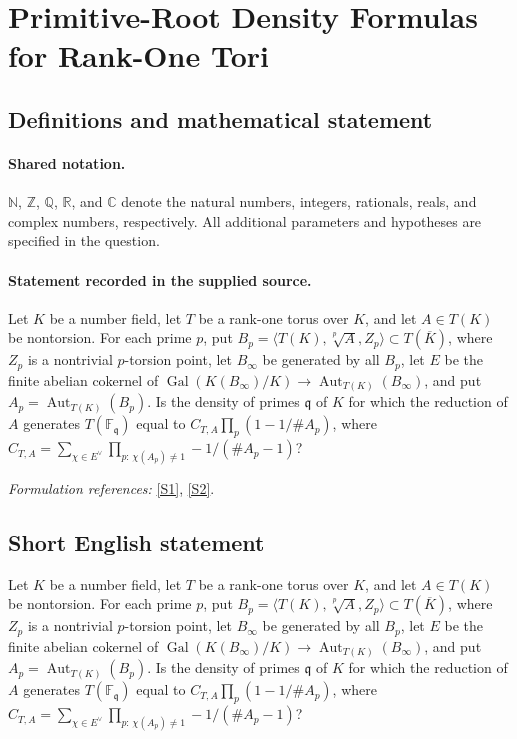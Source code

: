 \documentclass[11pt]{article}
\newcommand{\sref}[2]{\hyperlink{source:#1:#2}{[S#2]}}
\begin{document}
\section{Primitive-Root Density Formulas for Rank-One Tori}\label{statement}

\subsection{Definitions and mathematical statement}

\paragraph{Shared notation.}$\mathbb N$, $\mathbb Z$, $\mathbb Q$, $\mathbb R$, and $\mathbb C$ denote the natural numbers, integers, rationals, reals, and complex numbers, respectively. All additional parameters and hypotheses are specified in the question.


\paragraph{Statement recorded in the supplied source.}
Let $K$ be a number field, let $T$ be a rank-one torus over $K$, and let $A\in T(K)$ be nontorsion. For each prime $p$, put $B_p=\langle T(K),\sqrt[p]{A},Z_p\rangle\subset T(\overline K)$, where $Z_p$ is a nontrivial $p$-torsion point, let $B_\infty$ be generated by all $B_p$, let $E$ be the finite abelian cokernel of $\operatorname{Gal}(K(B_\infty)/K)\to\operatorname{Aut}_{T(K)}(B_\infty)$, and put $A_p=\operatorname{Aut}_{T(K)}(B_p)$. Is the density of primes $\mathfrak q$ of $K$ for which the reduction of $A$ generates $T(\mathbb F_{\mathfrak q})$ equal to $C_{T,A}\prod_p(1-1/\#A_p)$, where $C_{T,A}=\sum_{\chi\in E^\vee}\prod_{p:\,\chi(A_p)\neq1}-1/(\#A_p-1)$?
\par\smallskip\textit{Formulation references:} \sref{statement}{1}, \sref{statement}{2}.
\subsection{Short English statement}
Let $K$ be a number field, let $T$ be a rank-one torus over $K$, and let $A\in T(K)$ be nontorsion. For each prime $p$, put $B_p=\langle T(K),\sqrt[p]{A},Z_p\rangle\subset T(\overline K)$, where $Z_p$ is a nontrivial $p$-torsion point, let $B_\infty$ be generated by all $B_p$, let $E$ be the finite abelian cokernel of $\operatorname{Gal}(K(B_\infty)/K)\to\operatorname{Aut}_{T(K)}(B_\infty)$, and put $A_p=\operatorname{Aut}_{T(K)}(B_p)$. Is the density of primes $\mathfrak q$ of $K$ for which the reduction of $A$ generates $T(\mathbb F_{\mathfrak q})$ equal to $C_{T,A}\prod_p(1-1/\#A_p)$, where $C_{T,A}=\sum_{\chi\in E^\vee}\prod_{p:\,\chi(A_p)\neq1}-1/(\#A_p-1)$?
\end{document}
